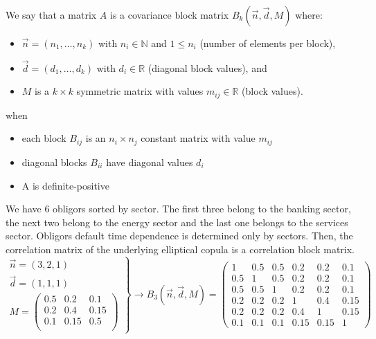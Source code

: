 \documentclass[11pt,fleqn]{book} %
\begin{document}
\begin{definition}
	We say that a matrix $A$ is a covariance block matrix $B_k(\vec{n},\vec{d},M)$
	where:
	\begin{itemize}
		\item $\vec{n}=(n_1,\dots,n_k)$ with $n_i \in \mathbb{N}$ and $1 \le n_i$ (number of elements per block),
		\item $\vec{d}=(d_1,\dots,d_k)$ with $d_i \in \mathbb{R}$ (diagonal block values), and
		\item $M$ is a $k {\times} k$ symmetric matrix with values $m_{ij} \in \mathbb{R}$ (block values).
	\end{itemize}
	when
	\begin{itemize}
		\item each block $B_{ij}$ is an $n_i {\times} n_j$ constant matrix with value $m_{ij}$
		\item diagonal blocks $B_{ii}$ have diagonal values $d_i$
		\item A is definite-positive
	\end{itemize}
\end{definition}

\begin{example}
	\label{example1}
	We have $6$ obligors sorted by sector. The first three belong to the 
	banking sector, the next two belong to the energy sector 
	and the last one belongs to the services sector. Obligors default time
	dependence is determined only by sectors. Then, the correlation matrix 
	of the underlying elliptical copula is a correlation block matrix.
	\small
	\begin{displaymath}
		\left.
		\begin{array}{l}
			\vec{n} = \left(3,2,1\right) \\
			\vec{d} = \left(1,1,1\right) \\
			M = \left(
			\begin{array}{ccc}
				0.5 & 0.2  & 0.1  \\
				0.2 & 0.4  & 0.15 \\
				0.1 & 0.15 & 0.5  \\
			\end{array}
			\right)
		\end{array}
		\right\}
		\rightarrow
		B_3(\vec{n},\vec{d},M)=
		\left(
		\begin{array}{ccc|cc|c} 
			1   & 0.5 & 0.5 & 0.2  & 0.2  & 0.1  \\ 
			0.5 & 1   & 0.5 & 0.2  & 0.2  & 0.1  \\ 
			0.5 & 0.5 & 1   & 0.2  & 0.2  & 0.1  \\ 
			\hline
			0.2 & 0.2 & 0.2 & 1    & 0.4  & 0.15 \\ 
			0.2 & 0.2 & 0.2 & 0.4  & 1    & 0.15 \\ 
			\hline
			0.1 & 0.1 & 0.1 & 0.15 & 0.15 & 1    
		\end{array} 
		\right)
	\end{displaymath}
\end{example}
\end{document}
